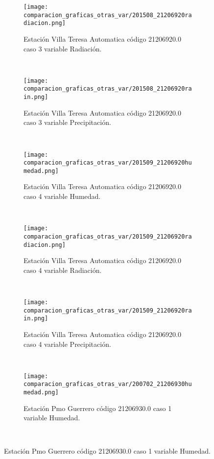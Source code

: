 \begin{figure}[H]
\centering
\begin{subfigure}[normla]{0.4\textwidth}
\caption{Estación Villa Teresa Automatica código 21206920.0 caso 3 variable Radiación.}
\texttt{[image: comparacion\_graficas\_otras\_var/201508\_21206920radiacion.png]}
\end{subfigure}
~
\begin{subfigure}[normla]{0.4\textwidth}
\caption{Estación Villa Teresa Automatica código 21206920.0 caso 3 variable Precipitación.}
\texttt{[image: comparacion\_graficas\_otras\_var/201508\_21206920rain.png]}
\end{subfigure}
~
\begin{subfigure}[normla]{0.4\textwidth}
\caption{Estación Villa Teresa Automatica código 21206920.0 caso 4 variable Humedad.}
\texttt{[image: comparacion\_graficas\_otras\_var/201509\_21206920humedad.png]}
\end{subfigure}
~
\begin{subfigure}[normla]{0.4\textwidth}
\caption{Estación Villa Teresa Automatica código 21206920.0 caso 4 variable Radiación.}
\texttt{[image: comparacion\_graficas\_otras\_var/201509\_21206920radiacion.png]}
\end{subfigure}
~
\begin{subfigure}[normla]{0.4\textwidth}
\caption{Estación Villa Teresa Automatica código 21206920.0 caso 4 variable Precipitación.}
\texttt{[image: comparacion\_graficas\_otras\_var/201509\_21206920rain.png]}
\end{subfigure}
~
\begin{subfigure}[normla]{0.4\textwidth}
\caption{Estación Pmo Guerrero código 21206930.0 caso 1 variable Humedad.}
\texttt{[image: comparacion\_graficas\_otras\_var/200702\_21206930humedad.png]}
\end{subfigure}
~
\end{figure}
           
